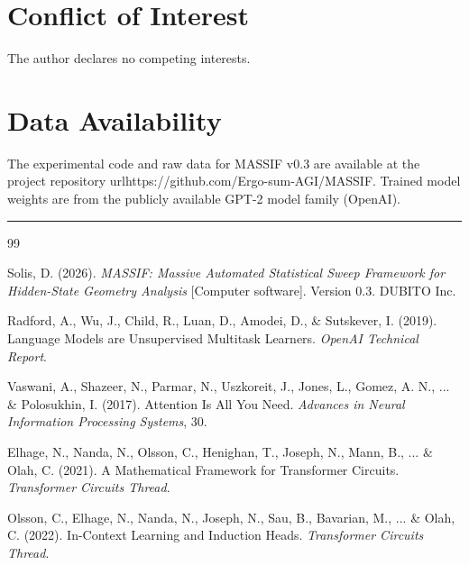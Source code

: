 \documentclass[12pt,a4paper]{article}
\begin{document}
\medskip

\section*{Conflict of Interest}

The author declares no competing interests.

\medskip

\section*{Data Availability}

The experimental code and raw data for MASSIF v0.3 are available at the project repository url{https://github.com/Ergo-sum-AGI/MASSIF}. Trained model weights are from the publicly available GPT-2 model family (OpenAI).

\medskip
\hrule
\medskip

\begin{thebibliography}{99}

\item[MASSIF v0.3] Solis, D. (2026). \textit{MASSIF: Massive Automated Statistical Sweep Framework for Hidden-State Geometry Analysis} [Computer software]. Version 0.3. DUBITO Inc.

\item[GPT-2] Radford, A., Wu, J., Child, R., Luan, D., Amodei, D., \& Sutskever, I. (2019). Language Models are Unsupervised Multitask Learners. \textit{OpenAI Technical Report}.

\item[Transformer Architecture] Vaswani, A., Shazeer, N., Parmar, N., Uszkoreit, J., Jones, L., Gomez, A. N., ... \& Polosukhin, I. (2017). Attention Is All You Need. \textit{Advances in Neural Information Processing Systems}, 30.

\item[Transformer Circuits] Elhage, N., Nanda, N., Olsson, C., Henighan, T., Joseph, N., Mann, B., ... \& Olah, C. (2021). A Mathematical Framework for Transformer Circuits. \textit{Transformer Circuits Thread}.

\item[Mechanistic Interpretability] Olsson, C., Elhage, N., Nanda, N., Joseph, N., Sau, B., Bavarian, M., ... \& Olah, C. (2022). In-Context Learning and Induction Heads. \textit{Transformer Circuits Thread}.

\end{thebibliography}
\end{document}

